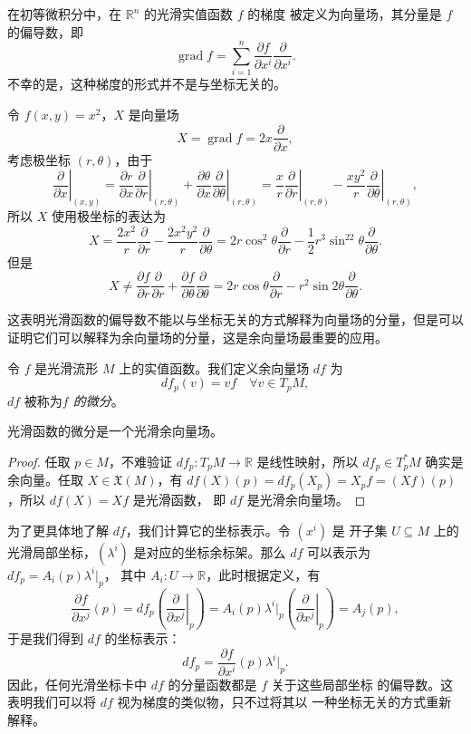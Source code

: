 \documentclass[fontset=none]{Notes}
\DeclareMathOperator\grad{grad}
\begin{document}
在初等微积分中，在 $\mathbb{R}^n$ 的光滑实值函数 $f$ 的梯度
被定义为向量场，其分量是 $f$ 的偏导数，即
\begin{equation}
  \grad f= \sum_{i=1}^n\frac{\partial f}{\partial x^i}\frac{\partial}{\partial x^i}.
\end{equation}
不幸的是，这种梯度的形式并不是与坐标无关的。

\begin{example}
  令 $f(x,y)=x^2$，$X$ 是向量场
  \[
    X=\grad f=2x\frac{\partial}{\partial x},  
  \]
  考虑极坐标 $(r,\theta)$，由于
  \[
    \left.\frac{\partial}{\partial x}\right|_{(x,y)} 
    =\frac{\partial r}{\partial x}\left.\frac{\partial}{\partial r}\right|_{(r,\theta)} 
    +\frac{\partial \theta}{\partial x}\left.\frac{\partial}{\partial \theta}\right|_{(r,\theta)} 
    =\frac{x}{r}\left.\frac{\partial}{\partial r}\right|_{(r,\theta)} 
    -\frac{xy^2}{r}\left.\frac{\partial}{\partial \theta}\right|_{(r,\theta)},
  \]
  所以 $X$ 使用极坐标的表达为
  \[
    X=  \frac{2x^2}{r}\frac{\partial}{\partial r}
    -\frac{2x^2y^2}{r}\frac{\partial}{\partial \theta}
    =2r\cos^2\theta\frac{\partial}{\partial r}-
    \frac{1}{2}r^3\sin^22\theta\frac{\partial}{\partial \theta}.
  \]
  但是
  \[
    X\neq \frac{\partial f}{\partial r}\frac{\partial}{\partial r}
    +\frac{\partial f}{\partial\theta}\frac{\partial}{\partial \theta}
    =2r\cos\theta  \frac{\partial}{\partial r}-r^2\sin 2\theta
    \frac{\partial}{\partial \theta}.
  \]
\end{example}

这表明光滑函数的偏导数不能以与坐标无关的方式解释为向量场的分量，但是可以
证明它们可以解释为余向量场的分量，这是余向量场最重要的应用。

令 $f$ 是光滑流形 $M$ 上的实值函数。我们定义余向量场 $df$ 为
\[
  df_p(v)=vf\quad \forall v\in T_pM,  
\]
$df$ 被称为\emph{$f$ 的微分}。

\begin{proposition}
  光滑函数的微分是一个光滑余向量场。
\end{proposition}
\begin{proof}
  任取 $p\in M$，不难验证 $df_p:T_pM\to \mathbb{R}$ 是线性映射，所以
  $df_p\in T_p^*M$ 确实是余向量。任取 $X\in \mathfrak{X}(M)$，有
  $df(X)(p)=df_p(X_p)=X_pf=(Xf)(p)$，所以 $df(X)=Xf$ 是光滑函数，
  即 $df$ 是光滑余向量场。
\end{proof}

为了更具体地了解 $df$，我们计算它的坐标表示。令 $\left(x^i\right)$ 是
开子集 $U\subseteq M$ 上的光滑局部坐标，$\left(\lambda^i\right)$
是对应的坐标余标架。那么 $df$ 可以表示为 $df_p=A_i(p)\lambda^i|_p$，
其中 $A_i:U\to \mathbb{R}$，此时根据定义，有
\[
  \frac{\partial f}{\partial x^j}(p)=df_p\left(\left.\frac{\partial}{\partial x^j}\right|_p\right)
  =  A_i(p)\lambda^i|_p \left(\left.\frac{\partial}{\partial x^j}\right|_p\right)
  =A_j(p),
\]
于是我们得到 $df$ 的坐标表示：
\begin{equation}\label{eq:coordinate represent of df}
  df_p=\frac{\partial f}{\partial x^i}(p)\lambda^i|_p.
\end{equation}
因此，任何光滑坐标卡中 $df$ 的分量函数都是 $f$ 关于这些局部坐标
的偏导数。这表明我们可以将 $df$ 视为梯度的类似物，只不过将其以
一种坐标无关的方式重新解释。
\end{document}
